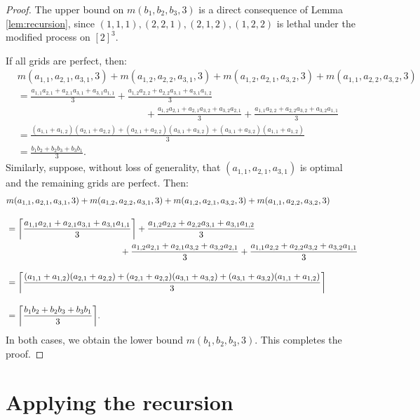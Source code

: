 \begin{proof}
The upper bound on $m(b_1, b_2, b_3, 3)$ is a direct consequence of Lemma \ref{lem:recursion}, since $(1,1,1), (2,2,1), (2,1,2), (1,2,2)$ is lethal under the modified process on $[2]^3$. 

If all grids are perfect, then:  
\begin{align*}
&m(a_{1,1}, a_{2,1}, a_{3,1}, 3) +  m(a_{1,2}, a_{2,2}, a_{3,1}, 3) + m(a_{1,2}, a_{2,1}, a_{3,2}, 3) + m(a_{1,1}, a_{2,2}, a_{3,2}, 3) \\[10pt]
&= \frac{a_{1,1}a_{2,1} + a_{2,1}a_{3,1} + a_{3,1}a_{1,1}}{3} + \frac{a_{1,2}a_{2,2} + a_{2,2}a_{3,1} + a_{3,1}a_{1,2}}{3} \\
&\qquad\qquad\qquad\qquad\qquad\qquad\quad + \frac{a_{1,2}a_{2,1} + a_{2,1}a_{3,2} + a_{3,2}a_{2,1}}{3} + \frac{a_{1,1}a_{2,2} + a_{2,2}a_{3,2} + a_{3,2}a_{1,1}}{3} \\[10pt]
&= \frac{(a_{1,1} + a_{1,2})(a_{2,1} + a_{2,2}) + (a_{2,1} + a_{2,2})(a_{3,1} + a_{3,2}) + (a_{3,1} + a_{3,2})(a_{1,1} + a_{1,2})}{3} \\[10pt]
&= \frac{b_1b_2+b_2b_3+b_3b_1}{3}.
\end{align*}
Similarly, suppose, without loss of generality, that $(a_{1,1}, a_{2,1}, a_{3,1})$ is optimal and the remaining grids are perfect. Then:
\begin{align*}
&m(a_{1,1}, a_{2,1}, a_{3,1}, 3) +  m(a_{1,2}, a_{2,2}, a_{3,1}, 3) + m(a_{1,2}, a_{2,1}, a_{3,2}, 3) + m(a_{1,1}, a_{2,2}, a_{3,2}, 3) \\[10pt]
&= \ceil*{\frac{a_{1,1}a_{2,1} + a_{2,1}a_{3,1} + a_{3,1}a_{1,1}}{3}} + \frac{a_{1,2}a_{2,2} + a_{2,2}a_{3,1} + a_{3,1}a_{1,2}}{3} \\
&\qquad\qquad\qquad\qquad\qquad\qquad\quad + \frac{a_{1,2}a_{2,1} + a_{2,1}a_{3,2} + a_{3,2}a_{2,1}}{3} + \frac{a_{1,1}a_{2,2} + a_{2,2}a_{3,2} + a_{3,2}a_{1,1}}{3} \\[10pt]
&= \ceil*{\frac{(a_{1,1} + a_{1,2})(a_{2,1} + a_{2,2}) + (a_{2,1} + a_{2,2})(a_{3,1} + a_{3,2}) + (a_{3,1} + a_{3,2})(a_{1,1} + a_{1,2})}{3}} \\[10pt]
&= \ceil*{\frac{b_1b_2+b_2b_3+b_3b_1}{3}}.
\end{align*}
In both cases, we obtain the lower bound $m(b_1, b_2, b_3, 3)$. This completes the proof. 
\end{proof}

\section{Applying the recursion}


